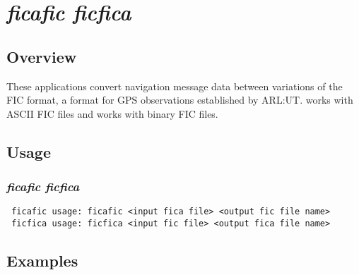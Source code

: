 %
%

\section{\emph{ficafic ficfica}}
\subsection{Overview}
These applications convert navigation message data between variations of the FIC format, a format for GPS observations established by ARL:UT.
 works with ASCII FIC files and  works with binary FIC files.

\subsection{Usage}
\subsubsection{\emph{ficafic ficfica}}
\begin{\outputsize}
\begin{verbatim}
 ficafic usage: ficafic <input fica file> <output fic file name>
 ficfica usage: ficfica <input fic file> <output fica file name>
\end{verbatim}
\end{\outputsize}

\subsection{Examples}

